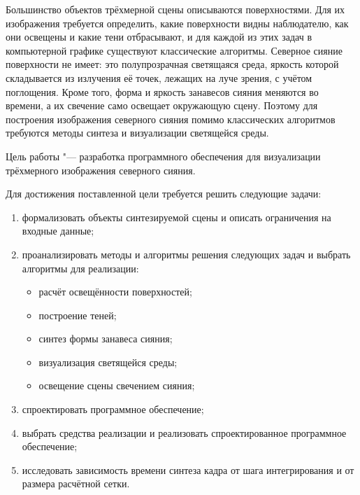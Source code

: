 
Большинство объектов трёхмерной сцены описываются поверхностями. Для их изображения требуется определить, какие поверхности видны наблюдателю, как они освещены и какие тени отбрасывают, и для каждой из этих задач в компьютерной графике существуют классические алгоритмы. Северное сияние поверхности не имеет: это полупрозрачная светящаяся среда, яркость которой складывается из излучения её точек, лежащих на луче зрения, с учётом поглощения. Кроме того, форма и яркость занавесов сияния меняются во времени, а их свечение само освещает окружающую сцену. Поэтому для построения изображения северного сияния помимо классических алгоритмов требуются методы синтеза и визуализации светящейся среды.

Цель работы "--- разработка программного обеспечения для визуализации трёхмерного изображения северного сияния.

Для достижения поставленной цели требуется решить следующие задачи:
\begin{enumerate}
	\item формализовать объекты синтезируемой сцены и описать ограничения на входные данные;
	\item проанализировать методы и алгоритмы решения следующих задач и выбрать алгоритмы для реализации:
	\begin{itemize}
		\item расчёт освещённости поверхностей;
		\item построение теней;
		\item синтез формы занавеса сияния;
		\item визуализация светящейся среды;
		\item освещение сцены свечением сияния;
	\end{itemize}
	\item спроектировать программное обеспечение;
	\item выбрать средства реализации и реализовать спроектированное программное обеспечение;
	\item исследовать зависимость времени синтеза кадра от шага интегрирования и от размера расчётной сетки.
\end{enumerate}
